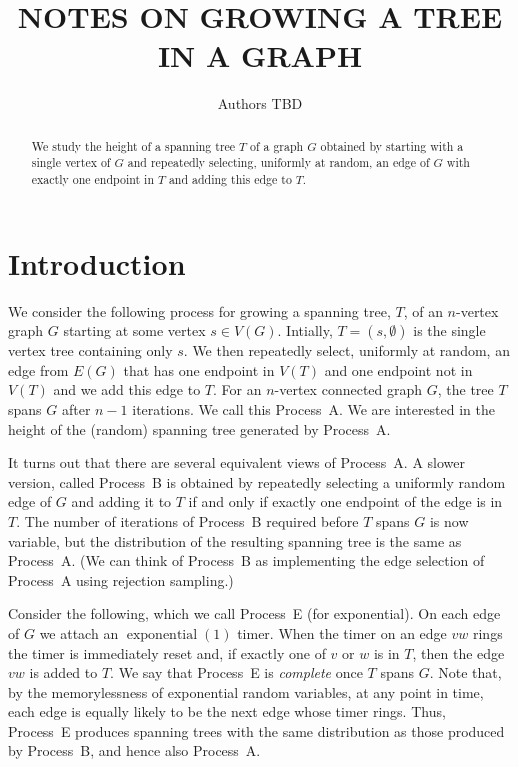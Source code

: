 \documentclass[lotsofwhite]{patmorin}
\title{\MakeUppercase{Notes on Growing a Tree in a Graph}}
\author{Authors TBD}
\DeclareMathOperator{\exponential}{exponential}
\begin{document}
\maketitle

\begin{abstract}
We study the height of a spanning tree $T$ of a graph $G$ obtained by
starting with a single vertex of $G$ and repeatedly selecting, uniformly
at random, an edge of $G$ with exactly one endpoint in $T$ and adding
this edge to $T$.
\end{abstract}

\tableofcontents
\newpage

\section{Introduction}

We consider the following process for growing a spanning tree,
$T$, of an $n$-vertex graph $G$ starting at some vertex $s\in V(G)$.  Intially,
$T=(s,\emptyset)$ is the single vertex tree containing only $s$. We then
repeatedly select, uniformly at random, an edge from $E(G)$ that has one
endpoint in $V(T)$ and one endpoint not in $V(T)$ and we add this edge
to $T$.  For an $n$-vertex connected graph $G$, the tree $T$ spans $G$
after $n-1$ iterations.  We call this Process~A.  We are interested in the
height of the (random) spanning tree generated by Process~A.

It turns out that there are several equivalent views of Process~A.
A slower version, called Process~B is obtained by repeatedly selecting
a uniformly random edge of $G$ and adding it to $T$ if and only if
exactly one endpoint of the edge is in $T$.  The number of iterations
of Process~B required before $T$ spans $G$ is now variable, but the
distribution of the resulting spanning tree is the same as Process~A.
(We can think of Process~B as implementing the edge selection of Process~A
using rejection sampling.)

Consider the following, which we call Process~E (for exponential).
On each edge of $G$ we attach an $\exponential(1)$ timer.  When the
timer on an edge $vw$ rings the timer is immediately reset and, if
exactly one of $v$ or $w$ is in $T$, then the edge $vw$ is added to $T$.
We say that Process~E is \emph{complete} once $T$ spans $G$.  Note that,
by the memorylessness of exponential random variables, at any point in
time, each edge is equally likely to be the next edge whose timer rings.
Thus, Process~E produces spanning trees with the same distribution as
those produced by Process~B, and hence also Process~A.
\end{document}
